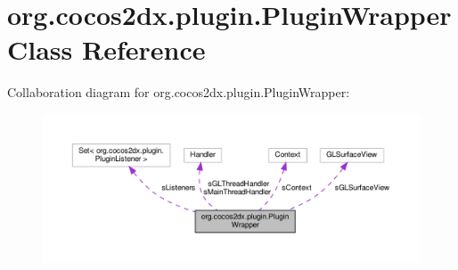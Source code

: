 \hypertarget{classorg_1_1cocos2dx_1_1plugin_1_1PluginWrapper}{}\section{org.\+cocos2dx.\+plugin.\+Plugin\+Wrapper Class Reference}
\label{classorg_1_1cocos2dx_1_1plugin_1_1PluginWrapper}


Collaboration diagram for org.\+cocos2dx.\+plugin.\+Plugin\+Wrapper\+:
\nopagebreak
\begin{figure}[H]
\begin{center}
\leavevmode
\includegraphics[width=350pt]{classorg_1_1cocos2dx_1_1plugin_1_1PluginWrapper__coll__graph}
\end{center}
\end{figure}
